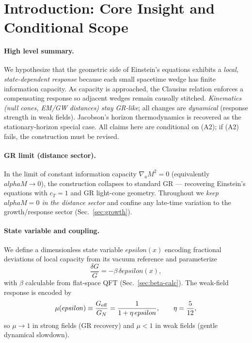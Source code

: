 \documentclass[aps,prd,onecolumn,superscriptaddress,nofootinbib]{revtex4-2}
\def\alphaM{alphaM}%
\def\eps{epsilon}%
\newcommand{\alphaM}{\alpha_M}
\newcommand{\eps}{\varepsilon}
\begin{document}
\maketitle

\section{Introduction: Core Insight and Conditional Scope}
\label{sec:intro}

\paragraph{High level summary.}
We hypothesize that the geometric side of Einstein’s equations exhibits a \emph{local, state-dependent response} because each small spacetime wedge has finite information capacity. As capacity is approached, the Clausius relation enforces a compensating response so adjacent wedges remain causally stitched. \emph{Kinematics (null cones, EM/GW distances) stay GR-like}; all changes are \emph{dynamical} (response strength in weak fields). Jacobson’s horizon thermodynamics is recovered as the stationary-horizon special case. All claims here are conditional on (A2); if (A2) fails, the construction must be revised.

\paragraph{GR limit (distance sector).}
In the limit of constant information capacity $\nabla_a M^2=0$ (equivalently $\alphaM\to 0$), the construction collapses to standard GR --- recovering Einstein’s equations with $c_T=1$ and GR light-cone geometry. Throughout we \emph{keep $\alphaM=0$ in the distance sector} and confine any late-time variation to the growth/response sector (Sec.~\ref{sec:growth}).

\paragraph{State variable and coupling.}
We define a dimensionless state variable $\eps(x)$ encoding fractional deviations of local capacity from its vacuum reference and parameterize
\begin{equation}
\label{eq:deltaG}
\frac{\delta G}{G} = -\beta\,\delta\eps(x),
\end{equation}
with $\beta$ calculable from flat-space QFT (Sec.~\ref{sec:beta-calc}). The weak-field response is encoded by
\begin{equation}
\label{eq:mu-def}
\mu(\eps)\equiv\frac{G_{\rm eff}}{G_N}=\frac{1}{1+\eta\,\eps},
\qquad \eta=\frac{5}{12},
\end{equation}
so $\mu\to 1$ in strong fields (GR recovery) and $\mu<1$ in weak fields (gentle dynamical slowdown).
\end{document}
